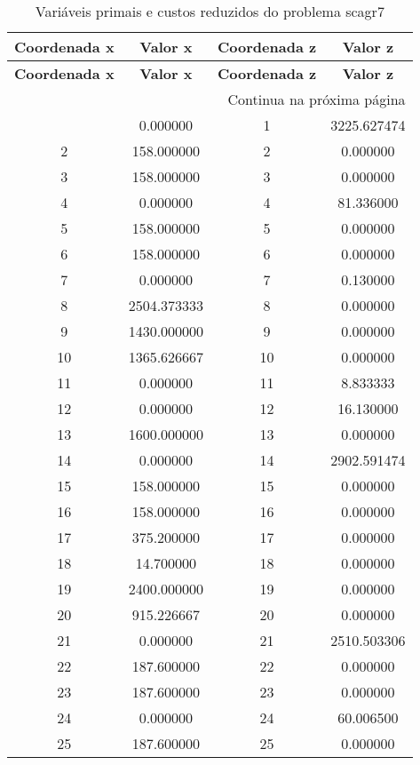 \documentclass[12pt]{article}
\begin{document}
\begin{longtable}{@{}cccc@{}}
\caption{Variáveis primais e custos reduzidos do problema scagr7} \\
\toprule
\textbf{Coordenada x} & \textbf{Valor x} & \textbf{Coordenada z} & \textbf{Valor z} \\
\midrule
\endfirsthead

\toprule
\textbf{Coordenada x} & \textbf{Valor x} & \textbf{Coordenada z} & \textbf{Valor z} \\
\midrule
\endhead

\midrule \multicolumn{4}{r}{{Continua na próxima página}} \\ \midrule
\endfoot

\bottomrule
\endlastfoot
1 & 0.000000 & 1 & 3225.627474 \\
2 & 158.000000 & 2 & 0.000000 \\
3 & 158.000000 & 3 & 0.000000 \\
4 & 0.000000 & 4 & 81.336000 \\
5 & 158.000000 & 5 & 0.000000 \\
6 & 158.000000 & 6 & 0.000000 \\
7 & 0.000000 & 7 & 0.130000 \\
8 & 2504.373333 & 8 & 0.000000 \\
9 & 1430.000000 & 9 & 0.000000 \\
10 & 1365.626667 & 10 & 0.000000 \\
11 & 0.000000 & 11 & 8.833333 \\
12 & 0.000000 & 12 & 16.130000 \\
13 & 1600.000000 & 13 & 0.000000 \\
14 & 0.000000 & 14 & 2902.591474 \\
15 & 158.000000 & 15 & 0.000000 \\
16 & 158.000000 & 16 & 0.000000 \\
17 & 375.200000 & 17 & 0.000000 \\
18 & 14.700000 & 18 & 0.000000 \\
19 & 2400.000000 & 19 & 0.000000 \\
20 & 915.226667 & 20 & 0.000000 \\
21 & 0.000000 & 21 & 2510.503306 \\
22 & 187.600000 & 22 & 0.000000 \\
23 & 187.600000 & 23 & 0.000000 \\
24 & 0.000000 & 24 & 60.006500 \\
25 & 187.600000 & 25 & 0.000000 \\

\end{longtable}
\end{document}
